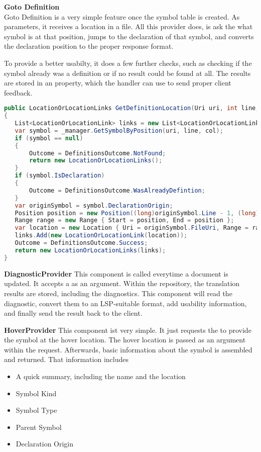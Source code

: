 \textbf{Goto Definition}\\
Goto Definition is a very simple feature once the symbol table is created. As parameters, it receives a location in a file. All this provider does, is ask the  what symbol is at that position, jumps to the declaration of that symbol, and converts the declaration position to the proper response format.

To provide a better usabilty, it does a few further checks, such as checking if the symbol already was a definition or if no result could be found at all. The results are stored in an  property, which the handler can use to send proper client feedback.

\begin{lstlisting}[language=csharp, caption={Providing Goto Definition}, captionpos=b, label={lst:gotoCore}]
public LocationOrLocationLinks GetDefinitionLocation(Uri uri, int line, int col)
{
   List<LocationOrLocationLink> links = new List<LocationOrLocationLink>();
   var symbol = _manager.GetSymbolByPosition(uri, line, col);
   if (symbol == null)
   {
       Outcome = DefinitionsOutcome.NotFound;
       return new LocationOrLocationLinks();
   }
   if (symbol.IsDeclaration)
   {
       Outcome = DefinitionsOutcome.WasAlreadyDefintion;
   }
   var originSymbol = symbol.DeclarationOrigin;
   Position position = new Position((long)originSymbol.Line - 1, (long)originSymbol.ColumnStart - 1);
   Range range = new Range { Start = position, End = position };
   var location = new Location { Uri = originSymbol.FileUri, Range = range };
   links.Add(new LocationOrLocationLink(location));
   Outcome = DefinitionsOutcome.Success;
   return new LocationOrLocationLinks(links);
}
\end{lstlisting}

\textbf{DiagnosticProvider}
This component is called everytime a document is updated. It accepts a  as an argument. Within the repository, the translation results are stored, including the diagnostics. This component will read the diagnostic, convert them to an LSP-suitable format, add usability information, and finally send the result back to the client.

\intnote{}

\textbf{HoverProvider}
This component ist very simple. It just requests the  to provide the symbol at the hover location. The hover location is passed as an argument within the request. Afterwards, basic information about the symbol is assembled and returned. That information includes \begin{itemize}
    \item A quick summary, including the name and the location
    \item Symbol Kind
    \item Symbol Type
    \item Parent Symbol
    \item Declaration Origin
\end{itemize}

